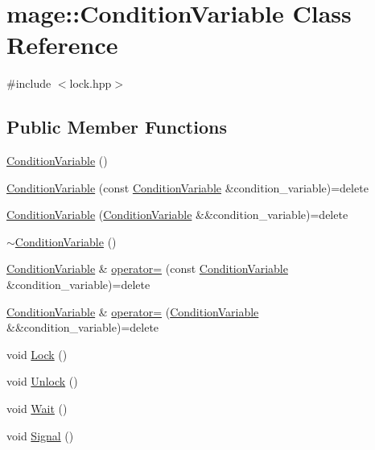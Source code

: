 \hypertarget{classmage_1_1_condition_variable}{}\section{mage\+:\+:Condition\+Variable Class Reference}
\label{classmage_1_1_condition_variable}


{\ttfamily \#include $<$lock.\+hpp$>$}

\subsection*{Public Member Functions}
\begin{DoxyCompactItemize}
\item 
\hyperlink{classmage_1_1_condition_variable_a09073f0affc601f052fce541a17ba559}{Condition\+Variable} ()
\item 
\hyperlink{classmage_1_1_condition_variable_add5ccf5807a94588c28621141df334d3}{Condition\+Variable} (const \hyperlink{classmage_1_1_condition_variable}{Condition\+Variable} \&condition\+\_\+variable)=delete
\item 
\hyperlink{classmage_1_1_condition_variable_a225e5144abef5b2ba1d8393777f1c4f1}{Condition\+Variable} (\hyperlink{classmage_1_1_condition_variable}{Condition\+Variable} \&\&condition\+\_\+variable)=delete
\item 
\hyperlink{classmage_1_1_condition_variable_accd5253beb65b2904428afdb889cf00b}{$\sim$\+Condition\+Variable} ()
\item 
\hyperlink{classmage_1_1_condition_variable}{Condition\+Variable} \& \hyperlink{classmage_1_1_condition_variable_ac83eae5353cd004ee06fe2376e5bdbf4}{operator=} (const \hyperlink{classmage_1_1_condition_variable}{Condition\+Variable} \&condition\+\_\+variable)=delete
\item 
\hyperlink{classmage_1_1_condition_variable}{Condition\+Variable} \& \hyperlink{classmage_1_1_condition_variable_a3f05c5b53b2530e9fdd1bb890aa375c4}{operator=} (\hyperlink{classmage_1_1_condition_variable}{Condition\+Variable} \&\&condition\+\_\+variable)=delete
\item 
void \hyperlink{classmage_1_1_condition_variable_acb0fa4a842b6979ac35c70dab0f43813}{Lock} ()
\item 
void \hyperlink{classmage_1_1_condition_variable_a3b3fe63417b7d7adedc9fe015fc7feea}{Unlock} ()
\item 
void \hyperlink{classmage_1_1_condition_variable_abc279c54285145d981f409c2d110c85a}{Wait} ()
\item 
void \hyperlink{classmage_1_1_condition_variable_a09e52f0d51c10ee565a895d2444175d9}{Signal} ()
\end{DoxyCompactItemize}
